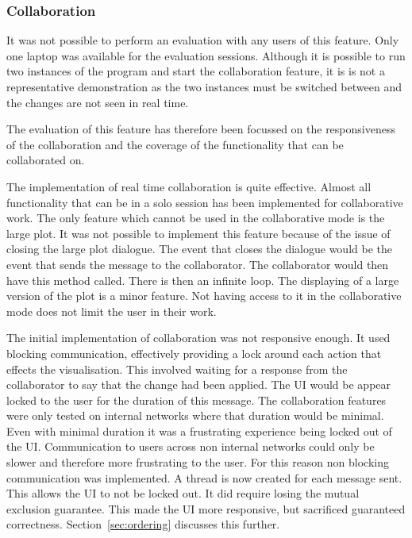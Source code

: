 \subsubsection{Collaboration}

It was not possible to perform an evaluation with any users of this feature.  Only one laptop was available for the evaluation sessions.  Although it is possible to run two instances of the program and start the collaboration feature, it is is not a representative demonstration as the two instances must be switched between and the changes are not seen in real time.

The evaluation of this feature has therefore been focussed on the responsiveness of the collaboration and the coverage of the functionality that can be collaborated on.

The implementation of real time collaboration is quite effective.  Almost all functionality that can be in a solo session has been implemented for collaborative work.  The only feature which cannot be used in the collaborative mode is the large plot. It was not possible to implement this feature because of the issue of closing the large plot dialogue.  The event that closes the dialogue would be the event that sends the message to the collaborator.  The collaborator would then have this method called.  There is then an infinite loop.  The displaying of a large version of the plot is a minor feature.  Not having access to it in the collaborative mode does not limit the user in their work.

The initial implementation of collaboration was not responsive enough.  It used blocking communication, effectively providing a lock around each action that effects the visualisation.  This involved waiting for a response from the collaborator to say that the change had been applied.  The \ac{UI} would be appear locked to the user for the duration of this message.  The collaboration features were only tested on internal networks where that duration would be minimal.  Even with minimal duration it was a frustrating experience being locked out of the \ac{UI}.  Communication to users across non internal networks could only be slower and therefore more frustrating to the user.  For this reason non blocking communication was implemented.  A thread is now created for each message sent.  This allows the \ac{UI} to not be locked out.  It did require losing the mutual exclusion guarantee.  This made the \ac{UI} more responsive, but sacrificed guaranteed correctness. Section~\ref{sec:ordering} discusses this further.


